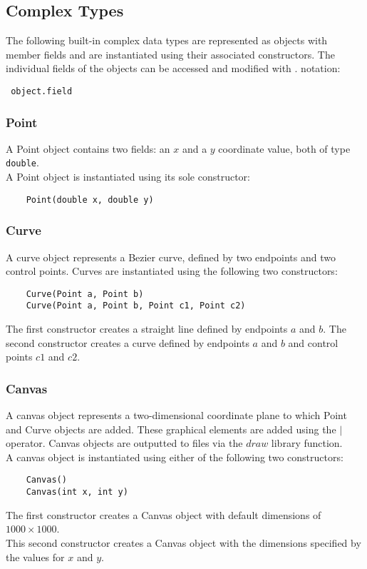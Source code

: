 \documentclass{article}
\begin{document}
\subsection{Complex Types}
The following built-in complex data types are represented as objects with member fields and are instantiated using their associated constructors. The individual fields of the objects can be accessed and modified with $.$ notation: \begin{verbatim} object.field \end{verbatim}

\subsubsection{Point}
A Point object contains two fields: an $x$ and a $y$ coordinate value, both of type \texttt{double}. \\
A Point object is instantiated using its sole constructor: 
\begin{verbatim}
    Point(double x, double y)
\end{verbatim}

\subsubsection{Curve}
A curve object represents a Bezier curve, defined by two endpoints and two control points. Curves are instantiated using the following two constructors:
\begin{verbatim}
    Curve(Point a, Point b) 
    Curve(Point a, Point b, Point c1, Point c2) 
\end{verbatim}
The first constructor creates a straight line defined by endpoints $a$ and $b$.
The second constructor creates a curve defined by endpoints $a$ and $b$ and control points $c1$ and $c2$.

\subsubsection{Canvas}
A canvas object represents a two-dimensional coordinate plane to which Point and Curve objects are added. 
These graphical elements are added using the $|$ operator. Canvas objects are outputted to files via the $draw$ library function.\\

\noindent A canvas object is instantiated using either of the following two constructors:
\begin{verbatim}
    Canvas() 
    Canvas(int x, int y) 
\end{verbatim}
The first constructor creates a Canvas object with default dimensions of $1000 \times 1000$.\\
This second constructor creates a Canvas object with the dimensions specified by the values for $x$ and $y$.
\end{document}
